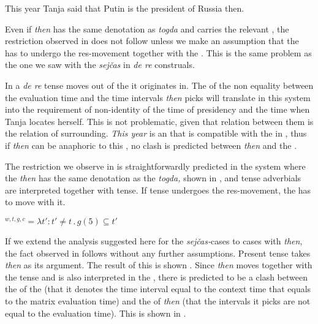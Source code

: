 \documentclass[output=paper,modfonts,newtxmath,hidelinks]{langscibook}
\begin{document}
\ea {\#}This year Tanja said that Putin is the president of Russia then.\label{20:ex53}

\z

\noindent Even if  \textit{then} has the same denotation as  \textit{togda} and carries the relevant , the restriction observed in  does not follow unless we make an assumption that the  has to undergo the res-movement together with the . This is the same problem as the one we saw with the  \textit{sejčas} in \textit{de re} construals.

In a \textit{de re}  tense moves out of the  it originates in. The  of the non equality between the evaluation time and the time intervals \textit{then} picks will translate in this system into the requirement of non-identity of the time of presidency and the time when Tanja locates herself. This is not problematic, given that relation between them is the relation of surrounding. \textit{This year} is an  that is compatible with the  in , thus if \textit{then} can be anaphoric to this , no clash is predicted between \textit{then} and the .

The restriction we observe in  is straightforwardly predicted in the system where the  \textit{then} has the same denotation as the  \textit{togda,} shown in , and tense adverbials are interpreted together with  tense. If tense undergoes the res-movement, the  has to move with it.

\ea {}$^{w,t,g,c}=\lambda t':t'\neq t\,.\,g(5)\subseteq t'$\label{20:ex54}
\z

\noindent If we extend the analysis suggested here for the  \textit{sejčas-}cases to  cases with \textit{then}, the fact observed in  follows without any further assumptions. Present tense takes \textit{then} as its argument. The result of this is shown . Since \textit{then} moves together with the tense and is also interpreted in the , there is predicted to be a clash between the  of the  (that it denotes the time interval equal to the context time that equals to the matrix evaluation time) and the  of \textit{then} (that the intervals it picks are not equal to the evaluation time). This is shown in .
\end{document}
